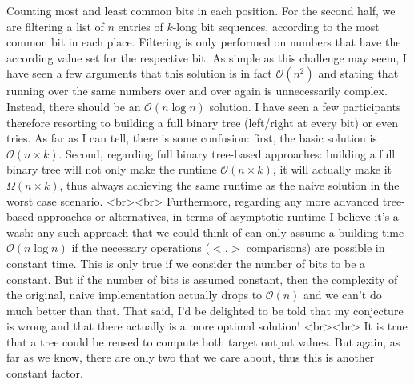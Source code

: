 Counting most and least common bits in each position. For the second half, we are filtering a list of $n$ entries of $k$-long bit sequences, according to the most common bit in each place. Filtering is only performed on numbers that have the according value set for the respective bit. As simple as this challenge may seem, I have seen a few arguments that this solution is in fact $\mathcal{O}(n^2)$ and stating that running over the same numbers over and over again is unnecessarily complex. Instead, there should be an $\mathcal{O}(n \log n)$ solution. I have seen a few participants therefore resorting to building a full binary tree (left/right at every bit) or even tries. As far as I can tell, there is some confusion: first, the basic solution is $\mathcal{O}(n \times k)$. Second, regarding full binary tree-based approaches: building a full binary tree will not only make the runtime $\mathcal{O}(n \times k)$, it will actually make it $\mathcal{\Omega}(n \times k)$, thus always achieving the same runtime as the naive solution in the worst case scenario.
<br><br>
Furthermore, regarding any more advanced tree-based approaches or alternatives, in terms of asymptotic runtime I believe it's a wash: any such approach that we could think of can only assume a building time $\mathcal{O}(n \log n)$ if the necessary operations ($<$,$>$ comparisons) are possible in constant time. This is only true if we consider the number of bits to be a constant. But if the number of bits is assumed constant, then the complexity of the original, naive implementation actually drops to  $\mathcal{O}(n)$ and we can't do much better than that. That said, I'd be delighted to be told that my conjecture is wrong and that there actually is a more optimal solution!
<br><br>
It is true that a tree could be reused to compute both target output values. But again, as far as we know, there are only two that we care about, thus this is another constant factor.